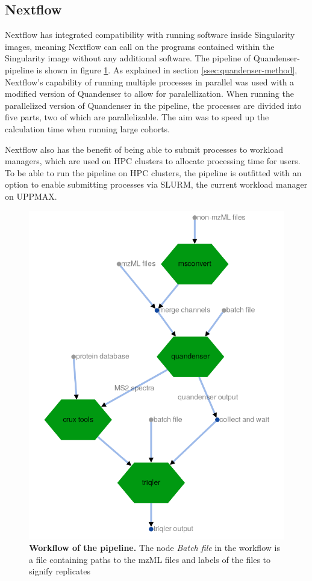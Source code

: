 \subsection{Nextflow}
Nextflow has integrated compatibility with running software inside Singularity images, meaning Nextflow can call on the programs contained within the Singularity image without any additional software. The pipeline of Quandenser-pipeline is shown in figure \ref{fig:workflow}. As explained in section \ref{ssec:quandenser-method}, Nextflow's capability of running multiple processes in parallel was used with a modified version of Quandenser to allow for paralellization. When running the parallelized version of Quandenser in the pipeline, the processes are divided into five parts, two of which are parallelizable. The aim was to speed up the calculation time when running large cohorts.

Nextflow also has the benefit of being able to submit processes to workload managers, which are used on HPC clusters to allocate processing time for users. To be able to run the pipeline on HPC clusters, the pipeline is outfitted with an option to enable submitting processes via SLURM, the current workload manager on UPPMAX.

\begin{figure}[H]
  \begin{center}
  \includegraphics[width=0.5\linewidth]{pictures/workflow.png}
  \caption{\textbf{Workflow of the pipeline.} The node \textit{Batch file} in the workflow is a file containing paths to the mzML files and labels of the files to signify replicates}
  \label{fig:workflow}
  \end{center}
\end{figure}

